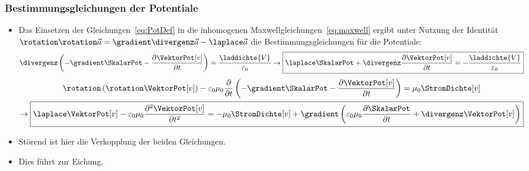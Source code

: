 \begin{frame}
  \frametitle{Bestimmungsgleichungen der Potentiale}
  \begin{itemize}[<+->]
    \item Das Einsetzen der Gleichungen~\eqref{eq:PotDef} in die inhomogenen Maxwellgleichungen~\eqref{eq:maxwell} ergibt unter Nutzung der Identität $\rotation\rotation \vec{a} = \gradient\divergenz\vec{a}-\laplace\vec{a}$ die Bestimmungsgleichungen für die Potentiale:
      \begin{equation}
           \divergenz \left(  -\gradient \SkalarPot - \frac{\partial \VektorPot[v]}{\partial t} \right)
           =  \frac{\laddichte{V}}{\varepsilon_0}\to \boxed{\laplace \SkalarPot + \divergenz \frac{\partial \VektorPot[v]}{\partial t} = -\frac{\laddichte{V}}{\varepsilon_0}}
           \label{eq:skalarpotallg}
         \end{equation}
         \begin{multline}
           \rotation\left(\rotation\VektorPot[v]\right) -\varepsilon_0\mu_0 \frac{\partial}{\partial t}\left( -\gradient \SkalarPot - \frac{\partial \VektorPot[v]}{\partial t}\right)
           = \mu_0 \StromDichte[v]\\
           \to \boxed{\laplace\VektorPot[v] -\varepsilon_0 \mu_0\frac{\partial^2\VektorPot[v]}{\partial t^2} = -\mu_0\StromDichte[v] +\gradient\left( \varepsilon_0\mu_0\frac{\partial\SkalarPot}{\partial t} + \divergenz\VektorPot[v]\right)}
         \label{eq:vektorpotallg}
       \end{multline}
     \item Störend ist hier die Verkopplung der beiden Gleichungen.
       \item Dies führt zur \alert{Eichung}.
    \end{itemize}
  \end{frame}

